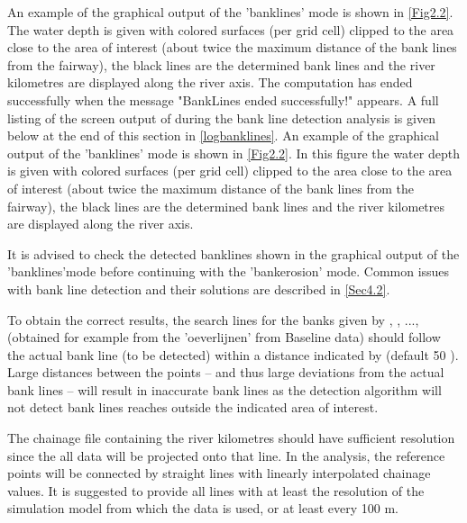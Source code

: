 An example of the graphical output of the 'banklines' mode is shown in \autoref{Fig2.2}.
The water depth is given with colored surfaces (per grid cell) clipped to the area close to the area of interest (about twice the maximum distance of the bank lines from the fairway), the black lines are the determined bank lines and the river kilometres are displayed along the river axis.
The computation has ended successfully when the message "BankLines ended successfully!" appears.
A full listing of the screen output of \dfastbe during the bank line detection analysis is given below at the end of this section in \autoref{logbanklines}. An example of the graphical output of the 'banklines' mode is shown in \autoref{Fig2.2}. In this figure the water depth is given with colored surfaces (per grid cell) clipped to the area close to the area of interest (about twice the maximum distance of the bank lines from the fairway), the black lines are the determined bank lines and the river kilometres are displayed along the river axis. 

\Note It is advised to check the detected banklines shown in the graphical output of the 'banklines'mode before continuing with the 'bankerosion' mode. Common issues with bank line detection and their solutions are described in \autoref{Sec4.2}.

\Note To obtain the correct results, the search lines for the banks given by , , ...,  (obtained for example from the 'oeverlijnen' from Baseline data) should follow the actual bank line (to be detected) within a distance indicated by  (default 50 ).
Large distances between the points -- and thus large deviations from the actual bank lines -- will result in inaccurate bank lines as the detection algorithm will not detect bank lines reaches outside the indicated area of interest.

\Note The chainage file containing the river kilometres should have sufficient resolution since the all data will be projected onto that line.
In the analysis, the reference points will be connected by straight lines with linearly interpolated chainage values.
It is suggested to provide all lines with at least the resolution of the simulation model from which the data is used, or at least every 100 m.


